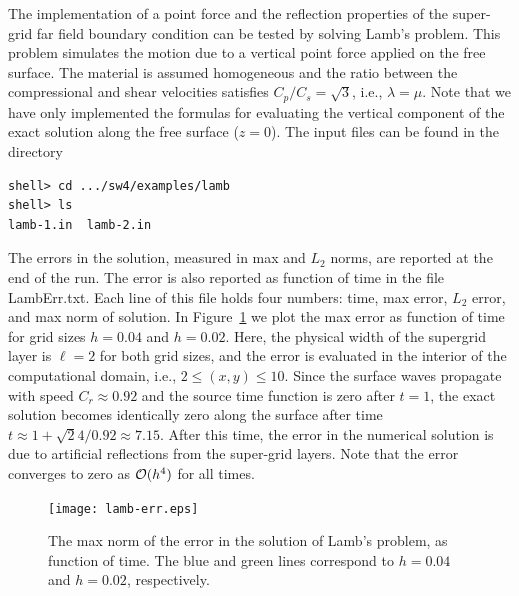 \documentclass[11pt]{report}
\begin{document}
The implementation of a point force and the reflection properties of the super-grid far field
boundary condition can be tested by solving Lamb's problem. This problem simulates the motion due to
a vertical point force applied on the free surface. The material is assumed homogeneous and the
ratio between the compressional and shear velocities satisfies $C_p/C_s = \sqrt{3}$, i.e.,
$\lambda=\mu$. Note that we have only implemented the formulas for evaluating the vertical component
of the exact solution along the free surface ($z=0$).
The input files can be found in the directory
\begin{verbatim}
shell> cd .../sw4/examples/lamb
shell> ls
lamb-1.in  lamb-2.in
\end{verbatim}
The errors in the solution, measured in max and $L_2$ norms, are reported at the end of the run. The
error is also reported as function of time in the file LambErr.txt. Each line of this file holds
four numbers: time, max error, $L_2$ error, and max norm of solution. In Figure~\ref{fig:lamb-err}
we plot the max error as function of time for grid sizes $h=0.04$ and $h=0.02$. Here, the physical
width of the supergrid layer is $\ell=2$ for both grid sizes, and the error is evaluated in the
interior of the computational domain, i.e., $2\leq (x,y) \leq 10$. Since the surface waves propagate
with speed $C_r\approx 0.92$ and the source time function is zero after $t=1$, the exact solution
becomes identically zero along the surface after time $t\approx 1 + \sqrt{2}4/0.92 \approx
7.15$. After this time, the error in the numerical solution is due to artificial reflections from
the super-grid layers. Note that the error converges to zero as ${\cal O}(h^4)$ for all times.
\begin{figure}
\begin{center}
\texttt{[image: lamb-err.eps]}
\caption{The max norm of the error in the solution of Lamb's problem, as function of time. The blue
and green lines correspond to $h=0.04$ and $h=0.02$, respectively.}
\label{fig:lamb-err}
\end{center}
\end{figure}

\end{document}
